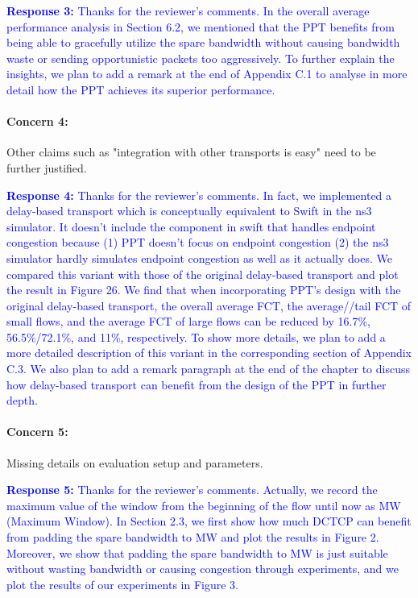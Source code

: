 \documentclass[12pt,one-column]{article}
\begin{document}
\noindent\textcolor{blue}{\textbf{Response 3:} 
Thanks for the reviewer’s comments. 
In the overall average performance analysis in Section 6.2, we mentioned that the PPT benefits from being able to gracefully utilize the spare bandwidth without causing bandwidth waste or sending opportunistic packets too aggressively.
To further explain the insights, we plan to add a remark at the end of Appendix C.1 to analyse in more detail how the PPT achieves its superior performance.
}

{\it \paragraph{Concern 4:} Other claims such as "integration with other transports is easy" need to be further justified.}


\noindent\textcolor{blue}{\textbf{Response 4:} 
Thanks for the reviewer’s comments. 
In fact, we implemented a delay-based transport which is conceptually equivalent to Swift in the ns3 simulator.
It doesn't include the component in swift that handles endpoint congestion because (1) PPT doesn't focus on endpoint congestion (2) the ns3 simulator hardly simulates endpoint congestion as well as it actually does. 
We compared this variant with those of the original delay-based transport and plot the result in Figure 26.
We find that when incorporating PPT's design with the original delay-based transport, the overall average FCT, the average//tail FCT of small flows, and the average FCT of large flows can be reduced by 16.7\%, 56.5\%/72.1\%, and 11\%, respectively.
To show more details, we plan to add a more detailed description of this variant in the corresponding section of Appendix C.3.
We also plan to add a remark paragraph at the end of the chapter to discuss how delay-based transport can benefit from the design of the PPT in further depth.
}

{\it \paragraph{Concern 5:}Missing details on evaluation setup and parameters.}


\noindent\textcolor{blue}{\textbf{Response 5:}
Thanks for the reviewer’s comments. 
Actually, we record the maximum value of the window from the beginning of the flow until now as MW (Maximum Window).
In Section 2.3, we first show how much DCTCP can benefit from padding the spare bandwidth to MW and plot the results in Figure 2.
Moreover, we show that padding the spare bandwidth to MW is just suitable without wasting bandwidth or causing congestion through experiments, and we plot the results of our experiments in Figure 3.
}
	
\end{document}

